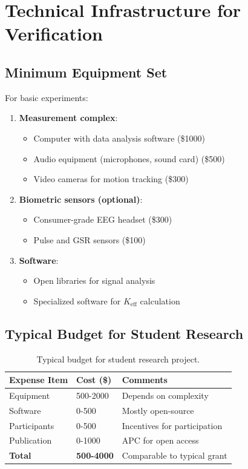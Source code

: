 \documentclass[12pt,a4paper]{article}
\begin{document}
	\section{Technical Infrastructure for Verification}
	
	\subsection{Minimum Equipment Set}
	
	For basic experiments:
	\begin{enumerate}
		\item \textbf{Measurement complex}:
		\begin{itemize}
			\item Computer with data analysis software (\$1000)
			\item Audio equipment (microphones, sound card) (\$500)
			\item Video cameras for motion tracking (\$300)
		\end{itemize}
		
		\item \textbf{Biometric sensors (optional)}:
		\begin{itemize}
			\item Consumer-grade EEG headset (\$300)
			\item Pulse and GSR sensors (\$100)
		\end{itemize}
		
		\item \textbf{Software}:
		\begin{itemize}
			\item Open libraries for signal analysis
			\item Specialized software for $K_{\mathrm{eff}}$ calculation
		\end{itemize}
	\end{enumerate}
	
	\subsection{Typical Budget for Student Research}
	
	\begin{table}[h]
		\centering
		\begin{tabular}{p{}p{}p{}}
			\toprule
			\textbf{Expense Item} & \textbf{Cost (\$)} & \textbf{Comments} \\
			\midrule
			Equipment & 500-2000 & Depends on complexity \\
			Software & 0-500 & Mostly open-source \\
			Participants & 0-500 & Incentives for participation \\
			Publication & 0-1000 & APC for open access \\
			\midrule
			\textbf{Total} & \textbf{500-4000} & Comparable to typical grant \\
			\bottomrule
		\end{tabular}
		\caption{Typical budget for student research project.}
		\label{tab:student-budget}
	\end{table}
	
\end{document}
